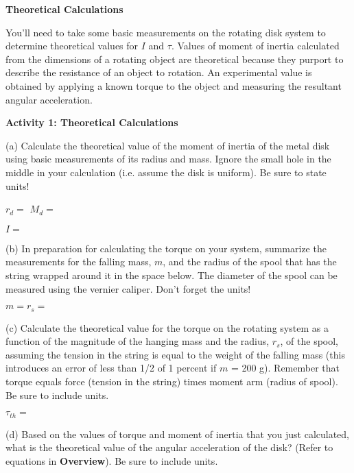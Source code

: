 \textbf{Theoretical Calculations} 

You'll need to take some basic measurements on the rotating disk system
to determine theoretical values for $I$ and \( \tau  \). Values of moment of
inertia calculated from the dimensions of a rotating object are theoretical
because they purport to describe the resistance of an object to rotation. An
experimental value is obtained by applying a known torque to the object and
measuring the resultant angular acceleration.

\newpage

\textbf{Activity 1: Theoretical Calculations }

(a) Calculate the theoretical value of the moment of inertia of the metal disk
using basic measurements of its radius and mass. Ignore the small hole in the
middle in your calculation (i.e. assume the disk is uniform). Be sure to state 
units!
\vspace{5mm}

\( r_{d} =\) \hfill{}\( M_{d}= \) \hfill{}
\vspace{5mm}

\( I = \) 
\vspace{5mm}

(b) In preparation for calculating the torque on your system, summarize the
measurements for the falling mass, $m$, and the radius of the spool that has the string wrapped around it in the space below. The diameter of the spool can be measured using the vernier caliper. Don't forget the units!
\vspace{5mm}

$m = $\hfill{}\(r_{s}= \)\hfill{} 
\vspace{5mm}

(c) Calculate the theoretical value for the torque on the rotating system as
a function of the magnitude of the hanging mass and the radius, \( r_{s} \),
of the spool, assuming the tension in the string is equal to the weight of the 
falling mass (this introduces an error of less than 1/2 of 1 percent if 
$m$ = 200 g). Remember that torque equals force (tension in the string) times 
moment arm (radius of spool). Be sure to include units.
\vspace{5mm}

\( \tau _{th}= \)
\vspace{5mm}

(d) Based on the values of torque and moment of inertia that you just 
calculated, what is the theoretical value of the angular acceleration of the 
disk? (Refer to equations in \textbf{Overview}). Be sure to include units.
\vspace{5mm}

